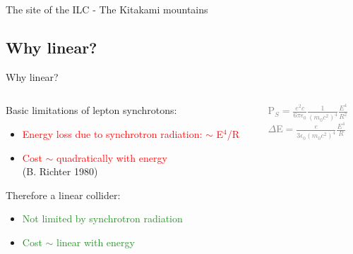 \documentclass[xcolor={dvipsnames}]{beamer}
\begin{document}
\begin{frame}{The site of the ILC - The Kitakami mountains}
\begin{center}
\end{center}
\end{frame}

\subsection{Why linear?}
\begin{frame}{Why linear?}
\begin{columns}
 \begin{column}{0.6\textwidth}
  Basic limitations of lepton synchrotons:
\begin{itemize}
 \item \textcolor{Red}{Energy loss due to synchrotron radiation: $\sim$ E$^4$/R}
 \item \textcolor{Red}{Cost $\sim$ quadratically with energy}\\ \tiny{(B. Richter 
1980)}
\end{itemize}
\vspace*{1cm}
Therefore a linear collider:
\begin{itemize}
 \item \textcolor{ForestGreen}{Not limited by synchrotron radiation}
 \item \textcolor{ForestGreen}{Cost $\sim$ linear with energy}
\end{itemize}
 \end{column}
 \begin{column}{0.4\textwidth}
 \begin{block}{}
  \begin{center}
      \textcolor{Gray}{P$_S=\frac{e^2c}{6\pi\epsilon_0}\frac{1}{(m_0c^2)^4}\frac{E^4}{R^2}$\\
  $\Delta$E$=\frac{e}{3\epsilon_0(m_0c^2)^4}\frac{E^4}{R}$}
   \end{center}
 \end{block}
 \end{column}
\end{columns}

\end{frame}


\end{document}
